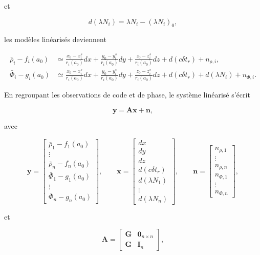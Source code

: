 et

\[
d(\lambda N_i)=\lambda N_i-(\lambda N_i)_0,
\]

les modèles linéarisés deviennent

\begin{align}
\bar{\rho}_i-f_i(a_0)
&\simeq
\frac{x_0-x_i^s}{r_i(a_0)}dx
+
\frac{y_0-y_i^s}{r_i(a_0)}dy
+
\frac{z_0-z_i^s}{r_i(a_0)}dz
+
d(c\delta t_r)
+
n_{\rho,i},
\\
\bar{\Phi}_i-g_i(a_0)
&\simeq
\frac{x_0-x_i^s}{r_i(a_0)}dx
+
\frac{y_0-y_i^s}{r_i(a_0)}dy
+
\frac{z_0-z_i^s}{r_i(a_0)}dz
+
d(c\delta t_r)
+
d(\lambda N_i)
+
n_{\Phi,i}.
\end{align}

En regroupant les observations de code et de phase, le système linéarisé s'écrit

\[
\mathbf y
=
\mathbf A\mathbf x
+
\mathbf n,
\]

avec

\[
\mathbf y=
\begin{bmatrix}
\bar{\rho}_1-f_1(a_0)\\
\vdots\\
\bar{\rho}_n-f_n(a_0)\\
\bar{\Phi}_1-g_1(a_0)\\
\vdots\\
\bar{\Phi}_n-g_n(a_0)
\end{bmatrix},
\qquad
\mathbf x=
\begin{bmatrix}
dx\\
dy\\
dz\\
d(c\delta t_r)\\
d(\lambda N_1)\\
\vdots\\
d(\lambda N_n)
\end{bmatrix},
\qquad
\mathbf n=
\begin{bmatrix}
n_{\rho,1}\\
\vdots\\
n_{\rho,n}\\
n_{\Phi,1}\\
\vdots\\
n_{\Phi,n}
\end{bmatrix},
\]

et

\[
\mathbf A=
\begin{bmatrix}
\mathbf G & \mathbf 0_{n\times n}\\
\mathbf G & \mathbf I_n
\end{bmatrix},
\]

